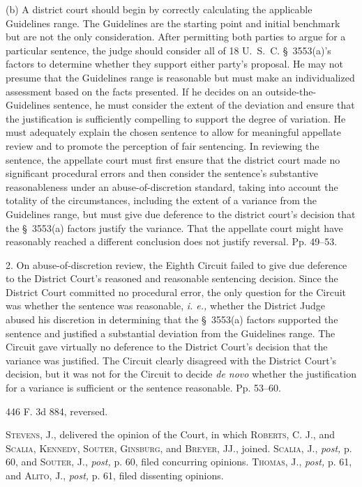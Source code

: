   (b) A district court should begin by correctly calculating the
applicable Guidelines range. The Guidelines are the starting point
and initial benchmark but are not the only consideration. After
permitting both parties to argue for a particular sentence, the
judge should consider all of 18 U.~S.~C. \S~3553(a)'s factors
to determine whether they support either party's proposal. He may
not presume that the Guidelines range is reasonable but must make an
individualized assessment based on the facts presented. If he decides
on an outside-the-Guidelines sentence, he must consider the extent
of the deviation and ensure that the justification is sufficiently
compelling to support the degree of variation. He must adequately
explain the chosen sentence to allow for meaningful appellate review
and to promote the perception of fair sentencing. In reviewing the
sentence, the appellate court must first ensure that the district court
made no significant procedural errors and then consider the sentence's
substantive reasonableness under an abuse-of-discretion standard, taking
into account the totality of the circumstances, including the extent of
a variance from the Guidelines range, but must give due deference to
the district court's decision that the \S~3553(a) factors justify
the variance. That the appellate court might have reasonably reached a
different conclusion does not justify reversal. Pp. 49--53.

  2. On abuse-of-discretion review, the Eighth Circuit failed to
give due deference to the District Court's reasoned and reasonable
sentencing decision. Since the District Court committed no procedural
error, the only question for the Circuit was whether the sentence was
reasonable, \emph{i. e.,} whether the District Judge abused his discretion
in determining that the \S~3553(a) factors supported the sentence and
justified a substantial deviation from the Guidelines range. The Circuit
gave virtually no deference to the District Court's decision that the
variance was justified. The Circuit clearly disagreed with the District
Court's decision, but it was not for the Circuit to decide \emph{de novo}
whether the justification for a variance is sufficient or the sentence
reasonable. Pp. 53--60.

446 F. 3d 884, reversed.

  \textsc{Stevens,} J., delivered the opinion of the Court, in which
\textsc{Roberts,} C. J., and \textsc{Scalia, Kennedy, Souter, Ginsburg,} and
\textsc{Breyer,} JJ., joined. \textsc{Scalia,} J., \emph{post,} p. 60, and
\textsc{Souter,} J., \emph{post,} p. 60, filed concurring opinions.
\textsc{Thomas,} J., \emph{post,} p. 61, and \textsc{Alito,} J., \emph{post,} p.
61, filed dissenting opinions.\newpage 

